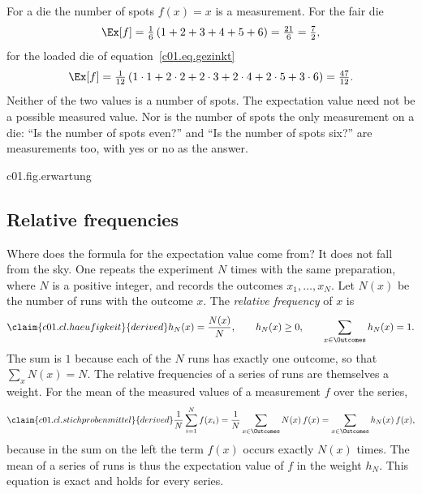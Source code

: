 \begin{example}\label{c01.ex.augenzahl}
  For a die the number of spots $f(x) = x$ is a measurement. For the fair die
  \begin{equation}\label{c01.eq.augenzahl-fair}
    \Ex[f] = \tfrac16\,(1 + 2 + 3 + 4 + 5 + 6) = \tfrac{21}{6} = \tfrac72 ,
  \end{equation}
  for the loaded die of equation~\eqref{c01.eq.gezinkt}
  \begin{equation}\label{c01.eq.augenzahl-gezinkt}
    \Ex[f] = \tfrac{1}{12}\,(1\cdot 1 + 2\cdot 2 + 2\cdot 3 + 2\cdot 4 + 2\cdot 5 + 3\cdot 6)
           = \tfrac{47}{12} .
  \end{equation}
  Neither of the two values is a number of spots. The expectation value need not be a
  possible measured value. Nor is the number of spots the only measurement on a die: “Is
  the number of spots even?” and “Is the number of spots six?” are measurements too, with
  yes or no as the answer.
\end{example}

\begin{tpcfigure}{c01.fig.erwartung}
  \caption{The expectation value of the number of spots as a centre of mass. If one thinks
    of the weights $\pw(x)$ as masses at the places $x$ of a beam, then $\Ex[f]$ is the
    place at which the beam balances: (a) for the fair die in the middle, at
    $\tfrac72$; (b) for the loaded die of equation~\eqref{c01.eq.gezinkt} shifted to the
    right, at $\tfrac{47}{12}$.}
\end{tpcfigure}

\subsection{Relative frequencies}\label{c01.s2.1}

Where does the formula for the expectation value come from? It does not fall from the sky.
One repeats the experiment $N$
times with the same preparation, where $N$ is a positive integer, and records the outcomes
$x_1, \dots, x_N$. Let $N(x)$ be
the number of runs with the outcome $x$. The \emph{relative frequency} of $x$ is
\begin{equation}\label{c01.eq.haeufigkeit}\claim{c01.cl.haeufigkeit}{derived}
  h_N(x) = \frac{N(x)}{N},
  \qquad
  h_N(x) \geq 0,
  \qquad
  \sum_{x \in \Outcomes} h_N(x) = 1 .
\end{equation}
The sum is $1$ because each of the $N$ runs has exactly one outcome, so that
$\sum_x N(x) = N$. The relative frequencies of a series of runs are themselves a weight.
For the mean of the measured values of a measurement $f$ over the series,
\begin{equation}\label{c01.eq.stichprobenmittel}\claim{c01.cl.stichprobenmittel}{derived}
  \frac{1}{N} \sum_{i=1}^{N} f(x_i)
  = \frac{1}{N} \sum_{x \in \Outcomes} N(x)\, f(x)
  = \sum_{x \in \Outcomes} h_N(x)\, f(x) ,
\end{equation}
because in the sum on the left the term $f(x)$ occurs exactly $N(x)$ times. The mean of a
series of runs is thus the expectation value of $f$ in the weight $h_N$. This equation is
exact and holds for every series.

